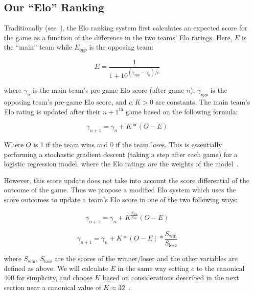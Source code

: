 \documentclass{article}
\begin{document}
\subsection{Our ``Elo'' Ranking}
Traditionally (see~\cite{mediumRatingSystem}), the Elo ranking system first calculates an expected score for the game as a function of the difference in the two teams' Elo ratings. Here, $E$ is the ``main'' team while $E_{opp}$ is the opposing team:

\begin{equation}\label{eq:E}
E = \frac{1}{1+10^{(\gamma_{opp}-\gamma_n)/c}}
\end{equation}

where $\gamma_n$ is the main team's pre-game Elo score (after game $n$), $\gamma_{opp}$ is the opposing team's pre-game Elo score, and $c, K > 0$ are constants. The main team's Elo rating is updated after their $n+1^{\text{th}}$ game based on the following formula:

\begin{equation}
\gamma_{n+1} = \gamma_n + K*(O - E)
\end{equation}


Where $O$ is 1 if the team wins and 0 if the team loses. This is essentially performing a stochastic gradient descent (taking a step after each game) for a logistic regression model, where the Elo ratings are the weights of the model~\cite{stmorseStatisticalLearning}.

However, this score update does not take into account the score differential of the outcome of the game. Thus we propose a modified Elo system which uses the score outcomes to update a team's Elo score in one of the two following ways: 

\begin{equation}
\label{exponentialUpdate}
\gamma_{n+1} = \gamma_n + K^{\frac{S_{\text{win}}}{S_{\text{lose}}}}(O - E)
\end{equation}


\begin{equation}
\label{multiplyUpdate}
\gamma_{n+1} = \gamma_n + K*(O - E)*\frac{S_{\text{win}}}{S_{\text{lose}}}
\end{equation}


where $S_{\text{win}}$, $S_{\text{lose}}$ are the scores of the winner/loser and the other variables are defined as above. We will calculate $E$ in the same way setting $c$ to the canonical 400 for simplicity, and choose $K$ based on considerations described in the next section near a canonical value  of $K\approx 32$~\cite{mediumRatingSystem}.
\end{document}
